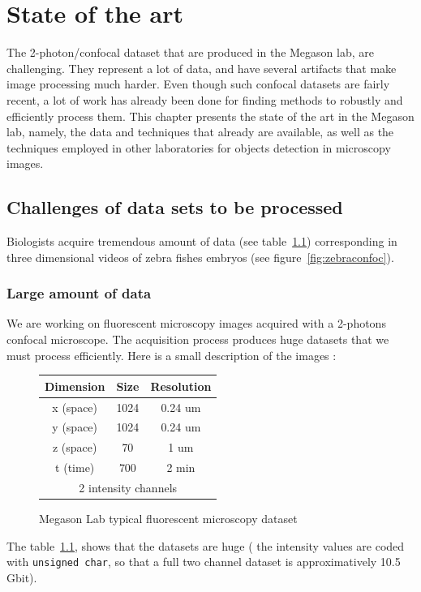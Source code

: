 
%
%


\chapter{State of the art}

The 2-photon/confocal dataset that are produced in the Megason lab, are challenging.
They represent a lot of data, and have several artifacts that make image processing much harder.
Even though such confocal datasets are fairly recent, a lot of work has already been done for finding methods to robustly and efficiently process them.
This chapter presents the state of the art in the Megason lab,
namely, the data and techniques that already are available, as well as the techniques employed in other laboratories for objects detection in microscopy images.



\section{Challenges of data sets to be processed}
\label{setc:ChallengesData}
Biologists acquire tremendous amount of data (see table~\ref{tab:DataSizes})
corresponding in three dimensional videos of zebra fishes embryos
(see figure~\ref{fig:zebraconfoc}).

\subsection{Large amount of data}

We are working on fluorescent microscopy images acquired with a 2-photons confocal microscope. The acquisition process produces huge datasets that we must process efficiently.
Here is a small description of the images :
\begin{figure}[htb]
\begin{center}
\begin{tabular}{|c|c|c|}
\hline Dimension & Size & Resolution \\ 
\hline x (space) & 1024 & 0.24 um \\ 
\hline y (space) & 1024 & 0.24 um \\ 
\hline z (space) & 70 & 1 um \\ 
\hline t (time) & 700 & 2 min\\ 
\hline \multicolumn{3}{|c|}{ 2 intensity channels} \\ 
\hline
\end{tabular} 
\end{center}
\caption{Megason Lab typical fluorescent microscopy dataset}
\label{tab:DataSizes}
\end{figure}
The table~\ref{tab:DataSizes}, shows that the datasets are huge ( the intensity values are coded with {\verb+unsigned char+}, so that a full two channel dataset is approximatively  10.5 Gbit).

